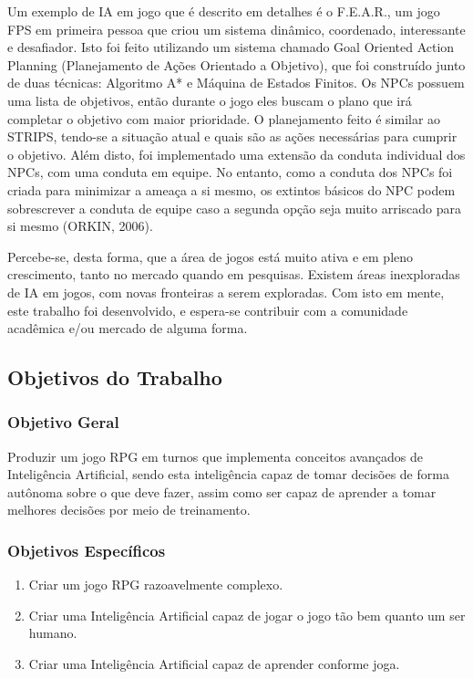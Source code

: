 \documentclass[12pt,a4paper]{article}
\begin{document}
	Um exemplo de IA em jogo que é descrito em detalhes é o F.E.A.R.,
	um jogo FPS em primeira pessoa
	que criou um sistema dinâmico, coordenado, interessante e desafiador.
	Isto foi feito utilizando um sistema chamado Goal Oriented Action Planning (Planejamento de Ações Orientado a Objetivo),
	que foi construído junto de duas técnicas: Algoritmo A* e Máquina de Estados Finitos.
	Os NPCs possuem uma lista de objetivos,
	então durante o jogo eles buscam o plano que irá completar o objetivo com maior prioridade.
	O planejamento feito é similar ao STRIPS,
	tendo-se a situação atual e quais são as ações necessárias para cumprir o objetivo.
	Além disto, foi implementado uma extensão da conduta individual dos NPCs,
	com uma conduta em equipe.
	No entanto, como a conduta dos NPCs foi criada para minimizar a ameaça a si mesmo,
	os extintos básicos do NPC podem sobrescrever a conduta de equipe
	caso a segunda opção seja muito arriscado para si mesmo (ORKIN, 2006).
	
	Percebe-se, desta forma, que a área de jogos está muito ativa e em pleno crescimento,
	tanto no mercado quando em pesquisas.
	Existem áreas inexploradas de IA em jogos,
	com novas fronteiras a serem exploradas.
	Com isto em mente, este trabalho foi desenvolvido,
	e espera-se contribuir com a comunidade acadêmica e/ou mercado de alguma forma.

	\subsection{Objetivos do Trabalho}
	
		\subsubsection{Objetivo Geral}
			Produzir um jogo RPG em turnos que implementa conceitos avançados de Inteligência Artificial,
			sendo esta inteligência capaz de tomar decisões de forma autônoma sobre o que deve fazer,
			assim como ser capaz de aprender a tomar melhores decisões por meio de treinamento.
		
		\subsubsection{Objetivos Específicos}
			\begin{enumerate}[noitemsep]
				\item Criar um jogo RPG razoavelmente complexo.
				\item Criar uma Inteligência Artificial capaz de jogar o jogo tão bem quanto um ser humano.
				\item Criar uma Inteligência Artificial capaz de aprender conforme joga.
			\end{enumerate}			
	
\end{document}
